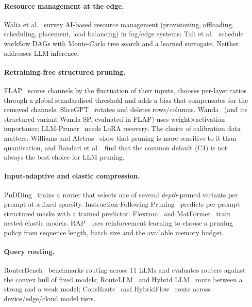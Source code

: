 \documentclass[11pt,a4paper]{article}
\begin{document}
\paragraph{Resource management at the edge.} Walia et al.~\citep{walia2024survey} survey AI-based
resource management (provisioning, offloading, scheduling, placement, load balancing) in fog/edge
systems; Tuli et al.~\citep{tuli2022mcds} schedule workflow DAGs with Monte-Carlo tree search and a
learned surrogate. Neither addresses LLM inference.

\paragraph{Retraining-free structured pruning.} FLAP~\citep{an2024flap} scores channels by the
fluctuation of their inputs, chooses per-layer ratios through a global standardised threshold and adds
a bias that compensates for the removed channels. SliceGPT~\citep{ashkboos2024slicegpt} rotates and
deletes rows/columns. Wanda~\citep{sun2024wanda} (and its structured variant Wanda-SP, evaluated in
FLAP) uses weight$\times$activation importance; LLM-Pruner~\citep{ma2023llmpruner} needs LoRA recovery.
The choice of calibration data matters: Williams and Aletras~\citep{williams2024calibration} show that
pruning is more sensitive to it than quantisation, and Bandari et al.~\citep{bandari2024c4} find that the
common default (C4) is not always the best choice for LLM pruning.

\paragraph{Input-adaptive and elastic compression.} PuDDing~\citep{wee2025pudding} trains a router that
selects one of several \emph{depth}-pruned variants per prompt at a fixed sparsity.
Instruction-Following Pruning~\citep{hou2025ifpruning} predicts per-prompt structured masks with a
trained predictor. Flextron~\citep{cai2024flextron} and MatFormer~\citep{devvrit2024matformer} train
nested elastic models. RAP~\citep{liu2025rap} uses reinforcement learning to choose a pruning policy
from sequence length, batch size and the available memory budget.

\paragraph{Query routing.} RouterBench~\citep{hu2024routerbench} benchmarks routing across 11 LLMs and
evaluates routers against the convex hull of fixed models; RouteLLM~\citep{ong2024routellm} and Hybrid
LLM~\citep{ding2024hybridllm} route between a strong and a weak model; ConsRoute~\citep{qiao2026consroute}
and HybridFlow~\citep{dong2026hybridflow} route across device/edge/cloud model tiers.
\end{document}
